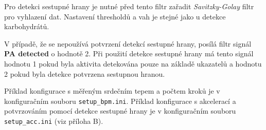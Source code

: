 Pro detekci sestupné hrany je nutné před tento filtr zařadit \textit{Savitzky-Golay} filtr pro vyhlazení dat. Nastavení thresholdů a vah je stejné jako u detekce karbohydrátů.


V případě, že se nepoužívá potvrzení detekcí sestupné hrany, posílá filtr signál \textbf{PA detected} o hodnotě 2. Při použití detekce sestupné hrany má tento signál hodnotu 1 pokud byla aktivita detekována pouze na základě ukazatelů a hodnotu 2 pokud byla detekce potvrzena sestupnou hranou.

Příklad konfigurace s měřeným srdečním tepem a počtem kroků je v konfiguračním souboru \texttt{setup\_bpm.ini}. Příklad konfigurace s akcelerací a potvrzováním pomocí detekce sestupné hrany je v konfiguračním souboru \texttt{setup\_acc.ini} (viz příloha B).